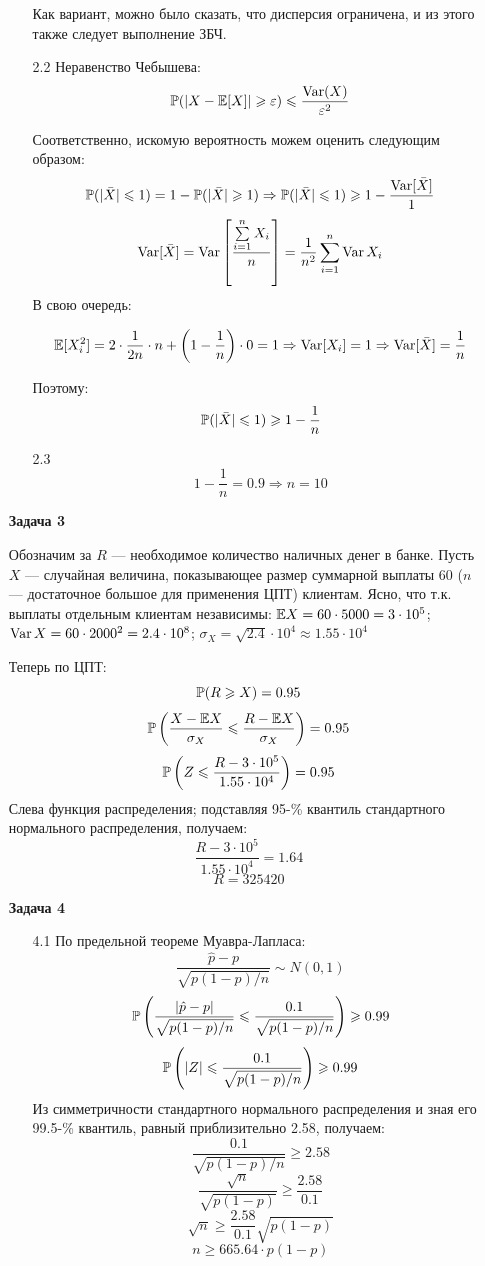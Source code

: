 \documentclass[12pt, a4paper]{article}\usepackage[]{graphicx}\usepackage[]{color}
\begin{document}
\begin{enumerate}
\begin{enumerate}
Как вариант, можно было сказать, что дисперсия ограничена, и из этого также следует выполнение ЗБЧ.
\item[2.2] Неравенство Чебышева:
\[
\P(|X-\E[X]|\geqslant \varepsilon) \leqslant \frac{\Var(X)}{\varepsilon^2}
\]

Соответственно, искомую вероятность можем оценить следующим образом:
\[
\P(|\bar{X}| \leqslant 1) = 1 -\P(|\bar{X}| \geqslant 1) \Rightarrow \P(|\bar{X}| \leqslant 1) \geqslant 1 - \frac{\Var[\bar{X}]}{1}
\]
\[
\Var[\bar{X}] = \Var\left[\frac{\sum\limits_{i=1}^{n} X_i}{n}\right] = \frac{1}{n^2}\sum \limits_{i=1}^{n} \Var{X_i}
\]
В свою очередь:

\[
\E[X_i^2] = 2\cdot\frac{1}{2n}\cdot n + \left(1-\frac{1}{n}\right)\cdot0 = 1 \Rightarrow \Var[X_i] = 1 \Rightarrow \Var[\bar{X}] = \frac{1}{n}
\]

Поэтому:
\[
\P(|\bar{X}| \leqslant 1)\geqslant 1 - \frac{1}{n}
\]

\item[2.3 ]  \[1 - \frac{1}{n} = 0.9  \Rightarrow n = 10\]

\end{enumerate}

\item[\textbf{Задача 3}]

Обозначим за $R$ — необходимое количество наличных денег в банке. Пусть $X$ — случайная величина, показывающее размер суммарной выплаты $60$ ($n$ — достаточное большое для применения ЦПТ) клиентам. Ясно, что т.к. выплаты отдельным клиентам независимы: \( \E X = 60 \cdot 5000 = 3\cdot 10^5 \); \( \Var X = 60 \cdot 2000^2 = 2.4 \cdot 10^8 \); \( \sigma_X = \sqrt{2.4} \cdot 10^4 \approx 1.55 \cdot 10^4\)

Теперь по ЦПТ:
\[\P(R \geqslant X) = 0.95 \]
\[\P \left(\dfrac{X - \E X}{\sigma_X} \leqslant \dfrac{R - \E X}{\sigma_X} \right) = 0.95 \]
\[ \P \left( Z \leqslant \dfrac{R - 3 \cdot 10^5}{1.55 \cdot 10^4} \right) = 0.95 \]
Слева функция распределения; подставляя 95-\% квантиль стандартного нормального распределения, получаем:
\[ \dfrac{R - 3 \cdot 10^5}{1.55 \cdot 10^4} = 1.64 \]
\[ R = 325420 \]


\item[\textbf{Задача 4}]

\begin{enumerate}
\item[4.1] По предельной теореме Муавра-Лапласа:
\[ \dfrac{\hat{p} - p}{\sqrt{p(1-p)/n}} \sim N (0,1) \]
\[ \P \left( \dfrac{|\hat{p} - p|}{\sqrt{p(1-p)/n}} \leqslant \dfrac{0.1}{\sqrt{p(1-p)/n}} \right) \geqslant 0.99 \]
\[ \P \left( |Z| \leqslant \dfrac{0.1}{\sqrt{p(1-p)/n}} \right) \geqslant 0.99 \]
Из симметричности стандартного нормального распределения и зная его 99.5-\% квантиль, равный приблизительно 2.58, получаем:
\[ \dfrac{0.1}{\sqrt{p(1-p)/n}} \geqslant 2.58 \]
\[ \dfrac{\sqrt{n}}{\sqrt{p(1-p)}} \geqslant \dfrac{2.58}{0.1} \]
\[ \sqrt{n} \geqslant \dfrac{2.58}{0.1} \sqrt{p(1-p)} \]
\[ n \geqslant 665.64 \cdot p(1-p) \]


\end{enumerate}
\end{enumerate}
\end{document}
